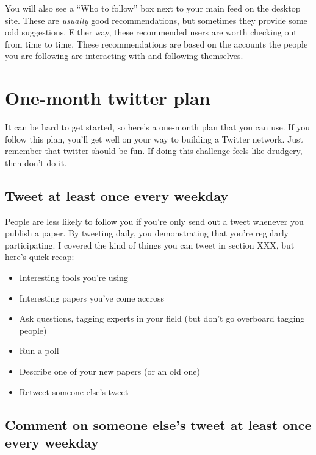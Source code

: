 \documentclass[]{book}
\providecommand{\tightlist}{%
  \setlength{\itemsep}{0pt}\setlength{\parskip}{0pt}}
\begin{document}
You will also see a ``Who to follow'' box next to your main feed on the desktop site. These are \emph{usually} good recommendations, but sometimes they provide some odd suggestions. Either way, these recommended users are worth checking out from time to time. These recommendations are based on the accounts the people you are following are interacting with and following themselves.

\hypertarget{one-month-twitter-plan}{%
\section{One-month twitter plan}\label{one-month-twitter-plan}}

It can be hard to get started, so here's a one-month plan that you can use. If you follow this plan, you'll get well on your way to building a Twitter network. Just remember that twitter should be fun. If doing this challenge feels like drudgery, then don't do it.

\hypertarget{tweet-at-least-once-every-weekday}{%
\subsection{Tweet at least once every weekday}\label{tweet-at-least-once-every-weekday}}

People are less likely to follow you if you're only send out a tweet whenever you publish a paper. By tweeting daily, you demonstrating that you're regularly participating. I covered the kind of things you can tweet in section XXX, but here's quick recap:

\begin{itemize}
\tightlist
\item
  Interesting tools you're using
\item
  Interesting papers you've come accross
\item
  Ask questions, tagging experts in your field (but don't go overboard tagging people)
\item
  Run a poll
\item
  Describe one of your new papers (or an old one)
\item
  Retweet someone else's tweet
\end{itemize}

\hypertarget{comment-on-someone-elses-tweet-at-least-once-every-weekday}{%
\subsection{Comment on someone else's tweet at least once every weekday}\label{comment-on-someone-elses-tweet-at-least-once-every-weekday}}
\end{document}
